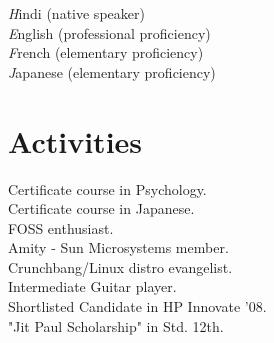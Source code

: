 \documentclass{article}
\begin{document}
\begin{minipage}[c]{0.40\textwidth}
{\emph Hindi} (native speaker)\\
{\emph English} (professional proficiency)\\
{\emph French} (elementary proficiency)\\
{\emph Japanese} (elementary proficiency)

\section*{{\color{green} Activities}}

Certificate course in Psychology.\\
Certificate course in Japanese.\\
FOSS enthusiast. \\
Amity - Sun Microsystems member.\\
Crunchbang/Linux distro evangelist.\\
Intermediate Guitar player.\\
Shortlisted Candidate in HP Innovate '08.\\
"Jit Paul Scholarship" in Std. 12th.

\end{minipage}
\end{document}

